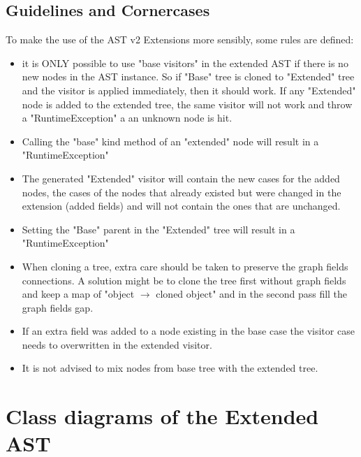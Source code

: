 \documentclass{overturerepchap}
\begin{document}
\section{Guidelines and Cornercases}

To make the use of the AST v2 Extensions more sensibly, some rules are defined:
\begin{itemize}
\item it is ONLY possible to use "base visitors" in the extended AST if there is no new nodes in the AST instance. So if "Base" tree is cloned to "Extended" tree and the visitor is applied immediately, then it should work. If any "Extended" node is added to the extended  tree, the same visitor will not work and throw a "RuntimeException" a an unknown node is hit.
\item Calling the "base" kind method of an "extended" node will result in a "RuntimeException"
\item The generated "Extended" visitor will contain the new cases for the added nodes, the cases of the nodes that already existed but were changed in the extension (added fields) and will not contain the ones that are unchanged.
\item Setting the "Base" parent in the "Extended" tree will result in a "RuntimeException"
\item When cloning a tree, extra care should be taken to preserve the graph fields connections. A solution might be to clone the tree first without graph fields and keep a map of "object $\rightarrow$ cloned object" and in the second pass fill the graph fields gap.
\item If an extra field was added to a node existing in the base case the visitor case needs to overwritten in the extended visitor.
\item It is not advised to mix nodes from base tree with the extended tree.
\end{itemize}

\appendix

\chapter{Class diagrams of the Extended AST}
\end{document}
